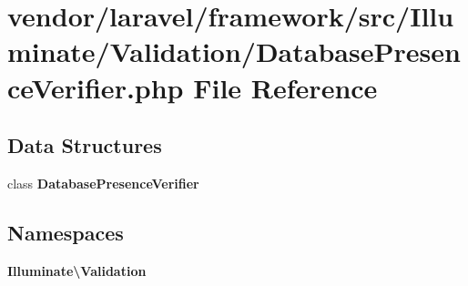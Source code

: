 \section{vendor/laravel/framework/src/\+Illuminate/\+Validation/\+Database\+Presence\+Verifier.php File Reference}
\label{_database_presence_verifier_8php}
\subsection*{Data Structures}
\begin{DoxyCompactItemize}
\item 
class {\bf Database\+Presence\+Verifier}
\end{DoxyCompactItemize}
\subsection*{Namespaces}
\begin{DoxyCompactItemize}
\item 
 {\bf Illuminate\textbackslash{}\+Validation}
\end{DoxyCompactItemize}
